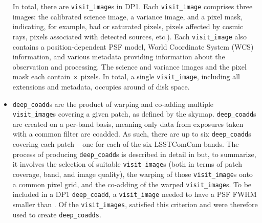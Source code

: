 \begin{itemize}
In total, there are \nvisitimages \texttt{visit\_image}s in \gls{DP1}.
Each \texttt{visit\_image}  comprises three images: the calibrated science image, a variance image, and a pixel mask, indicating, for example, bad or saturated pixels, pixels affected by cosmic rays, pixels associated with detected sources, etc.).
Each \texttt{visit\_image} also contains a position-dependent PSF model, \gls{World Coordinate System} (WCS) information, and various metadata providing information about the observation and processing.
The science and variance images and the pixel mask each contain \nvisitimagepixx$\times$ \nvisitimagepixy pixels.
In total, a single \texttt{visit\_image}, including all extensions and \gls{metadata}, occupies around \visitimagehdd of disk space.





\item \texttt{deep\_coadd}s are the product of warping and co-adding multiple \texttt{visit\_image}s covering a given \gls{patch}, as defined by the skymap.
\texttt{deep\_coadd}s are created on a per-band basis, meaning only data from exposures taken with a common filter are coadded.
As such, there are up to six \texttt{deep\_coadd}s covering each patch -- one for each of the six \gls{LSSTComCam} bands.
The process of producing \texttt{deep\_coadd}s is described in detail in  but, to summarize, it involves the selection of suitable \texttt{visit\_image}s (both in terms of \gls{patch} coverage, band, and image quality), the warping of those \texttt{visit\_image}s onto a common pixel grid, and the co-adding of the warped \texttt{visit\_image}s.
To be included in a DP1 \texttt{deep\_coadd}, a \texttt{visit\_image} needed to have a PSF \gls{FWHM} smaller than \deepcoaddmaxfwhm. Of the \nvisitimages \texttt{visit\_images}, \nselectedvisitimages satisfied this criterion and were therefore used to create \texttt{deep\_coadds}.


\end{itemize}
